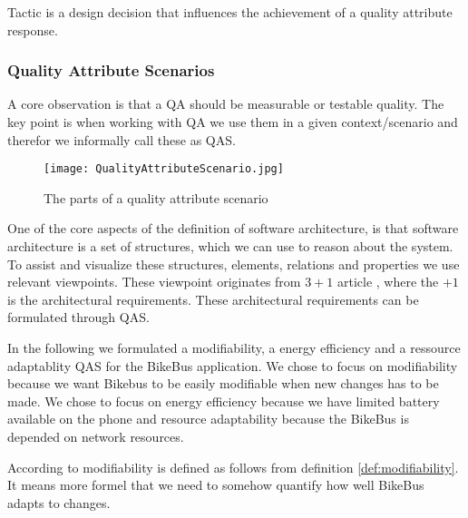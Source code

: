 \begin{defi}
Tactic is a design decision that influences the achievement of a quality attribute response. 
\label{def:tactic}
\end{defi}

\subsubsection{Quality Attribute Scenarios}

A core observation is that a QA should be measurable or testable quality. The key point is when working with QA we use them in a given context/scenario and therefor we informally call these as QAS.\\



\begin{figure}[H]
\centering
\texttt{[image: QualityAttributeScenario.jpg]}

\caption{The parts of a quality attribute scenario}
\label{fig:Quality_Attribute_Scenario}
\end{figure}






One of the core aspects of the definition of software architecture, is that software architecture is a set of structures, which we can use to reason about the system. To assist and visualize these structures, elements, relations and properties we use relevant viewpoints. These viewpoint originates from $3+1$ article \cite{3+1}, where the $+1$ is the architectural requirements. These architectural requirements can be formulated through QAS.


In the following we formulated a modifiability, a energy efficiency and a ressource adaptablity QAS for the BikeBus application. We chose to focus on modifiability because we want Bikebus to be easily modifiable when new changes has to be made. We chose to focus on energy efficiency because we have limited battery available on the phone and resource adaptability because the BikeBus is depended on network resources.

According to \cite{Bass} modifiability is defined as follows from definition \ref{def:modifiability}. It means more formel that we need to somehow quantify how well BikeBus adapts to changes.

